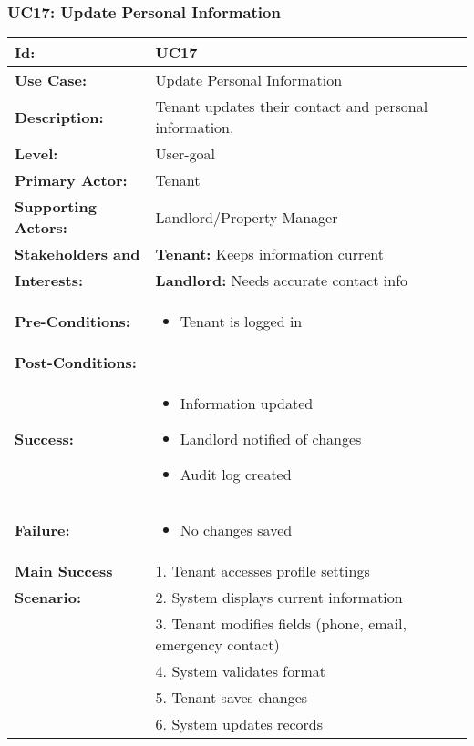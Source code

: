 \documentclass[12pt]{article}
\begin{document}
\subsubsection{UC17: Update Personal Information}

\begin{longtable}{|p{3cm}|p{11cm}|}
\hline
\textbf{Id:} & UC17 \\
\hline
\textbf{Use Case:} & Update Personal Information \\
\hline
\textbf{Description:} & Tenant updates their contact and personal information. \\
\hline
\textbf{Level:} & User-goal \\
\hline
\textbf{Primary Actor:} & Tenant \\
\hline
\textbf{Supporting Actors:} & Landlord/Property Manager \\
\hline
\textbf{Stakeholders and} & \textbf{Tenant:} Keeps information current \\
\textbf{Interests:} & \textbf{Landlord:} Needs accurate contact info \\
\hline
\textbf{Pre-Conditions:} & 
\begin{itemize}
    \item Tenant is logged in
\end{itemize} \\
\hline
\textbf{Post-Conditions:} & \\
\textbf{Success:} & 
\begin{itemize}
    \item Information updated
    \item Landlord notified of changes
    \item Audit log created
\end{itemize} \\
\textbf{Failure:} & 
\begin{itemize}
    \item No changes saved
\end{itemize} \\
\hline
\textbf{Main Success} & 1. Tenant accesses profile settings \\
\textbf{Scenario:} & 2. System displays current information \\
& 3. Tenant modifies fields (phone, email, emergency contact) \\
& 4. System validates format \\
& 5. Tenant saves changes \\
& 6. System updates records \\

\end{longtable}
\end{document}

